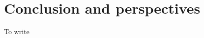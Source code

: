 \documentclass[../../Main_ManuscritThese.tex]{subfiles}
\begin{document}
\relax

\begingroup


\TitleBtwLines

\clearpage

\chapter*{Conclusion and perspectives}
\label{chap:Conclusion}
\pagestyle{conclusionStyle}




To write

\subfileLocal{
	\pagestyle{empty}
	
        
}
\relax

\endgroup
\end{document}
